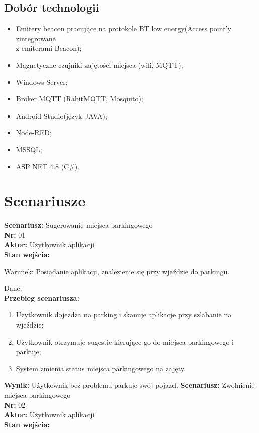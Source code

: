 \documentclass[12pt,a4paper]{article}
\begin{document}
\subsection{Dobór technologii}
\begin{itemize}
\item Emitery beacon pracujące na protokole BT low energy(Access point’y zintegrowane \\z emiterami Beacon);
\item Magnetyczne czujniki zajętości miejsca (wifi, MQTT);
\item Windows Server;
\item Broker MQTT (RabitMQTT, Mosquito);
\item Android Studio(język JAVA);
\item Node-RED;
\item MSSQL;
\item ASP NET 4.8  (C\#).
\end{itemize}



\newpage

\section{Scenariusze}
{\large \bf Scenariusz:} Sugerowanie miejsca parkingowego
\\{\bf Nr:} 01
\\{\bf Aktor:} Użytkownik aplikacji
\\{\bf Stan wejścia:}

Warunek: Posiadanie aplikacji, znalezienie się przy wjeździe do parkingu.

Dane:
\\{\bf Przebieg scenariusza:}
\begin{enumerate}
\item Użytkownik dojeżdża na parking i skanuje aplikacje przy szlabanie na wjeździe;
\item Użytkownik otrzymuje sugestie kierujące go do miejsca parkingowego i parkuje;
\item System zmienia status miejsca parkingowego na zajęty.
\end{enumerate}
{\bf Wynik:} Użytkownik bez problemu parkuje swój pojazd.
\newline\newline
{\large \bf Scenariusz:} Zwolnienie miejsca parkingowego
\\{\bf Nr:} 02
\\{\bf Aktor:} Użytkownik aplikacji
\\{\bf Stan wejścia:}
\end{document}
